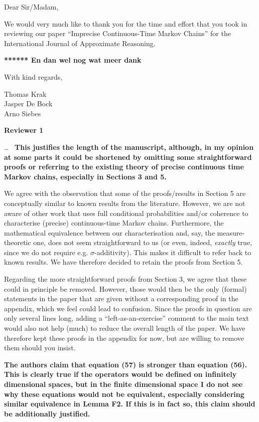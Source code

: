 \documentclass[twoside,11pt]{letter}
\begin{document}
Dear Sir/Madam,

We would very much like to thank you for the time and effort that you took in reviewing our paper ``Imprecise Continuous-Time Markov Chains'' for the International Journal of Approximate Reasoning.

{\bf ******* En dan wel nog wat meer dank }

With kind regards,

Thomas Krak\\
Jasper De Bock\\
Arno Siebes
\newline\newline

\newpage
{\bf Reviewer 1}

\ldots~\newline
{\bf 
This justifies the length of the manuscript, although, in my opinion at some parts it could be shortened 
by omitting some straightforward proofs or referring to the existing theory of 
precise continuous time Markov chains, especially in Sections 3 and 5. }

We agree with the observation that some of the proofs/results in Section 5 are conceptually similar to known results from the literature. However, we are not aware of other work that uses full conditional probabilities and/or coherence to characterise (precise) continuous-time Markov chains. Furthermore, the mathematical equivalence between our characterisation and, say, the measure-theoretic one, does not seem straightforward to us (or even, indeed, \emph{exactly} true, since we do not require e.g. $\sigma$-additivity). This makes it difficult to refer back to known results. We have therefore decided to retain the proofs from Section 5.

Regarding the more straightforward proofs from Section 3, we agree that these could in principle be removed. However, those would then be the only (formal) statements in the paper that are given without a corresponding proof in the appendix, which we feel could lead to confusion. Since the proofs in question are only several lines long, adding a ``left-as-an-exercise'' comment to the main text would also not help (much) to reduce the overall length of the paper. We have therefore kept these proofs in the appendix for now, but are willing to remove them should you insist.

{\bf The authors claim that equation (57) is stronger than equation (56). 
This is clearly true if the operators would be defined on infinitely dimensional spaces, 
but in the finite dimensional space I do not see why these equations would not be equivalent, 
especially considering similar equivalence in Lemma F2. If this is in fact so, this claim should be additionally justified. }
\end{document}

